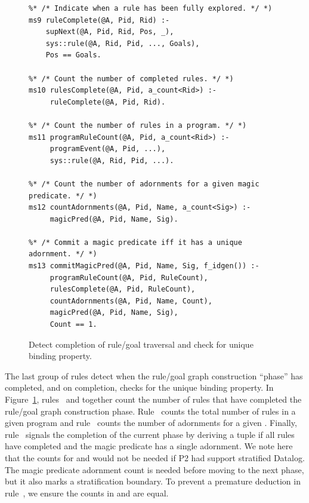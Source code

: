 \begin{figure}
\ssp
\centering
\begin{lstlisting}
%* /* Indicate when a rule has been fully explored. */ *)
ms9 ruleComplete(@A, Pid, Rid) :-
    supNext(@A, Pid, Rid, Pos, _),
    sys::rule(@A, Rid, Pid, ..., Goals),
    Pos == Goals. 
	       
%* /* Count the number of completed rules. */ *)
ms10 rulesComplete(@A, Pid, a_count<Rid>) :-
     ruleComplete(@A, Pid, Rid).
	        
%* /* Count the number of rules in a program. */ *)
ms11 programRuleCount(@A, Pid, a_count<Rid>) :-
     programEvent(@A, Pid, ...),
     sys::rule(@A, Rid, Pid, ...).
	
%* /* Count the number of adornments for a given magic predicate. */ *)
ms12 countAdornments(@A, Pid, Name, a_count<Sig>) :-
     magicPred(@A, Pid, Name, Sig).
	       
%* /* Commit a magic predicate iff it has a unique adornment. */ *)
ms13 commitMagicPred(@A, Pid, Name, Sig, f_idgen()) :-
     programRuleCount(@A, Pid, RuleCount),
     rulesComplete(@A, Pid, RuleCount),
     countAdornments(@A, Pid, Name, Count),
     magicPred(@A, Pid, Name, Sig),
     Count == 1.
\end{lstlisting}
\caption{\label{ch:magic:fig:magic4}Detect completion of rule/goal traversal 
and check for unique binding property.}
\end{figure}

The last group of rules detect when the rule/goal graph construction ``phase''
has completed, and on completion, checks for the unique binding property.  In
Figure~\ref{ch:magic:fig:magic4}, rules~ and  together count
the number of rules that have completed the rule/goal graph construction phase.
Rule~ counts the total number of rules in a given program and
rule~ counts the number of adornments for a given .
Finally, rule~ signals the completion of the current phase by deriving
a  tuple if all rules have completed and the magic
predicate has a single adornment.  We note here that the counts for
 and  would not be needed if P2 had
support stratified Datalog.  The magic predicate adornment count is needed
before moving to the next phase, but it also marks a stratification boundary.
To prevent a premature  deduction in rule~, we
ensure the counts in  and  are equal.


